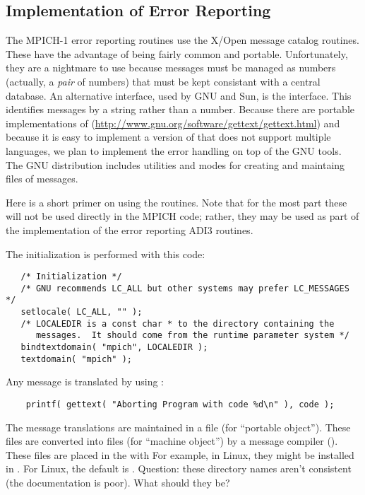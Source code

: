 \documentclass[dvipdfm]{article}
\begin{document}


\subsection{Implementation of Error Reporting}
\label{sec:error-report-impl}
The MPICH-1 error reporting routines use the X/Open  message
catalog routines.  These have the advantage of being fairly common and
portable.  Unfortunately, they are a nightmare to use because messages must be
managed as numbers (actually, a \emph{pair} of numbers) that must be kept
consistant with a central database.  An 
alternative interface, used by GNU and Sun, is the  interface.
This identifies messages by a string rather than a number.
Because there are portable implementations of 
(\url{http://www.gnu.org/software/gettext/gettext.html}) and because it is
easy to implement a version of  that does not support multiple
languages, we plan to implement the error handling on top of the GNU
 tools.  The GNU  distribution includes utilities
and  modes for creating and maintaing files of messages.

Here is a short primer on using the  routines.  Note that for
the most part these will not be used directly in the MPICH code; rather, they
may be used as part of the implementation of the error reporting ADI3
routines.

The initialization is performed with this code:
\begin{verbatim}
   /* Initialization */
   /* GNU recommends LC_ALL but other systems may prefer LC_MESSAGES */
   setlocale( LC_ALL, "" );
   /* LOCALEDIR is a const char * to the directory containing the
      messages.  It should come from the runtime parameter system */
   bindtextdomain( "mpich", LOCALEDIR );
   textdomain( "mpich" );
\end{verbatim}

Any message is translated by using :
\begin{verbatim}
    printf( gettext( "Aborting Program with code %d\n" ), code );
\end{verbatim}
The message translations are maintained in a  file (for ``portable
object'').  These files are converted into  files (for ``machine
object'') by a message compiler ().  These files are placed in
the  with 
For example, in Linux, they might be installed in
.   For Linux, the default
 is .  
Question: these directory names aren't consistent (the documentation is
poor).  What should they be?
\end{document}
